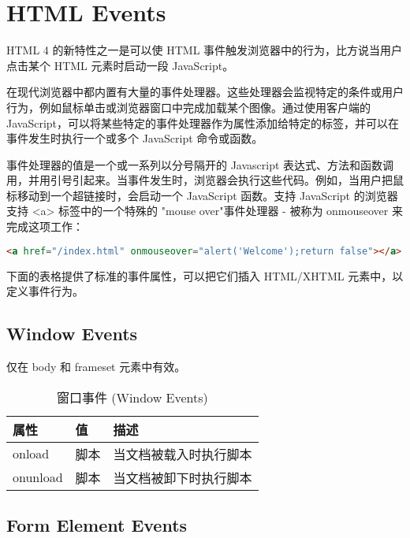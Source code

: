 \part{HTML Events}


HTML 4 的新特性之一是可以使 HTML 事件触发浏览器中的行为，比方说当用户点击某个 HTML 元素时启动一段 JavaScript。

在现代浏览器中都内置有大量的事件处理器。这些处理器会监视特定的条件或用户行为，例如鼠标单击或浏览器窗口中完成加载某个图像。通过使用客户端的 JavaScript，可以将某些特定的事件处理器作为属性添加给特定的标签，并可以在事件发生时执行一个或多个 JavaScript 命令或函数。

事件处理器的值是一个或一系列以分号隔开的 Javascript 表达式、方法和函数调用，并用引号引起来。当事件发生时，浏览器会执行这些代码。例如，当用户把鼠标移动到一个超链接时，会启动一个 JavaScript 函数。支持 JavaScript 的浏览器支持 <a> 标签中的一个特殊的 "mouse over"事件处理器 - 被称为 onmouseover 来完成这项工作：


\begin{lstlisting}[language=HTML]
     <a href="/index.html" onmouseover="alert('Welcome');return false"></a>
\end{lstlisting}

下面的表格提供了标准的事件属性，可以把它们插入 HTML/XHTML 元素中，以定义事件行为。





\chapter{Window Events}

仅在 body 和 frameset 元素中有效。


\begin{table}[!h]
\centering
\caption{窗口事件 (Window Events)}
\begin{tabular}{|l|l|l|}
\hline
属性		&值		&描述\\
\hline
onload	&脚本	&当文档被载入时执行脚本\\
\hline
onunload	&脚本	&当文档被卸下时执行脚本\\
\hline
\end{tabular}
\end{table}








\chapter{Form Element Events}

